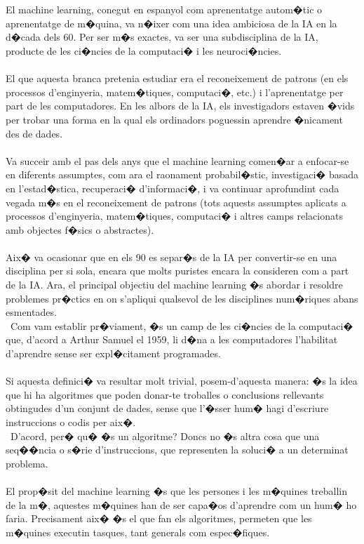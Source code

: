 \documentclass[12pt,a4paper,openright,oneside]{article}
\numberwithin{equation}{section}
\theoremstyle{definition}
\begin{document}
\\\\
El machine learning, conegut en espanyol com aprenentatge autom�tic o aprenentatge de m�quina, va n�ixer com una idea ambiciosa de la IA en la d�cada dels 60. Per ser m�s exactes, va ser una subdisciplina de la IA, producte de les ci�ncies de la computaci� i les neuroci�ncies. \\\\
El que aquesta branca pretenia estudiar era el reconeixement de patrons (en els processos d'enginyeria, matem�tiques, computaci�, etc.) i l'aprenentatge per part de les computadores. En les albors de la IA, els investigadors estaven �vids per trobar una forma en la qual els ordinadors poguessin aprendre �nicament des de dades. \\\\
Va succeir amb el pas dels anys que el machine learning comen�ar a enfocar-se en diferents assumptes, com ara el raonament probabil�stic, investigaci� basada en l'estad�stica, recuperaci� d'informaci�, i va continuar aprofundint cada vegada m�s en el reconeixement de patrons (tots aquests assumptes aplicats a processos d'enginyeria, matem�tiques, computaci� i altres camps relacionats amb objectes f�sics o abstractes).\\\\
Aix� va ocasionar que en els 90 es separ�s de la IA per convertir-se en una disciplina per si sola, encara que molts puristes encara la consideren com a part de la IA. Ara, el principal objectiu del machine learning �s abordar i resoldre problemes pr�ctics en on s'apliqui qualsevol de les disciplines num�riques abans esmentades.\\\
Com vam establir pr�viament, �s un camp de les ci�ncies de la computaci� que, d'acord a Arthur Samuel el 1959, li d�na a les computadores l'habilitat d'aprendre sense ser expl�citament programades.
\\\\
Si aquesta definici� va resultar molt trivial, posem-d'aquesta manera: �s la idea que hi ha algoritmes que poden donar-te troballes o conclusions rellevants obtingudes d'un conjunt de dades, sense que l'�sser hum� hagi d'escriure instruccions o codis per aix�.
\\\
D'acord, per� qu� �s un algoritme? Doncs no �s altra cosa que una seq��ncia o s�rie d'instruccions, que representen la soluci� a un determinat problema.
\\\\
El prop�sit del machine learning �s que les persones i les m�quines treballin de la m�, aquestes m�quines han de ser capa�os d'aprendre com un hum� ho faria. Precisament aix� �s el que fan els algoritmes, permeten que les m�quines executin tasques, tant generals com espec�fiques.
\end{document}
